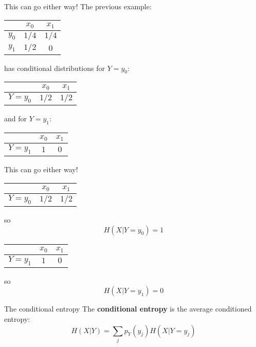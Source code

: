 \documentclass{beamer}
\newcommand{\crish}{\color{reddish}}
\newcommand{\cbla}{\color{black}}
\newcommand{\cblu}{\color{blue}}
\newcommand{\cgre}{\color{green}}
\newcommand{\sm}{\color{reddish}$}
\newcommand{\fm}{$\color{black}{}}
\begin{document}
\begin{frame}{This can go either way!}
  The previous example:
  \begin{center}
\color{purple}
    \begin{tabular}{c|cc}
&$x_0$&$x_1$\\
\hline
$y_0$&\cgre$1/4$&\cgre$1/4$\\
$y_1$&\cblu$1/2$&\cblu$0$
    \end{tabular}
    \color{black}
  \end{center}
  has conditional distributions for \sm Y=y_0\fm:
  \begin{center}
    \color{green}
    \begin{tabular}{c|cc}
  &$x_0$&$x_1$\\
\hline
$Y=y_0$&$1/2$&$1/2$\\
    \end{tabular}
\cbla
  \end{center}
    and for \sm Y=y_1\fm:
    \begin{center}
      \color{blue}
    \begin{tabular}{c|cc}
  &$x_0$&$x_1$\\
\hline
$Y=y_1$&$1$&$0$\\
    \end{tabular}
    \cbla
    \end{center}
\end{frame}


\begin{frame}{This can go either way!}
  \begin{center}
    \color{green}
    \begin{tabular}{c|cc}
  &$x_0$&$x_1$\\
\hline
$Y=y_0$&$1/2$&$1/2$\\
    \end{tabular}
\cbla
  \end{center}
      so
    \cgre
    $$
    H(X|Y=y_0)=1
    $$
    \vskip 1cm
    \begin{center}
      \color{blue}
    \begin{tabular}{c|cc}
  &$x_0$&$x_1$\\
\hline
$Y=y_1$&$1$&$0$\\
    \end{tabular}
    \cbla
    \end{center}
    \cbla
    so
    \cblu
    $$
    H(X|Y=y_1)=0
    $$
    \cbla
\end{frame}

\begin{frame}{The conditional entropy}
  The \textbf{conditional entropy} is the average conditioned entropy:
  \crish
  $$
H(X|Y)=\sum_j p_Y(y_j) H(X|Y=y_j)
$$
\cbla
\end{frame}
\end{document}
